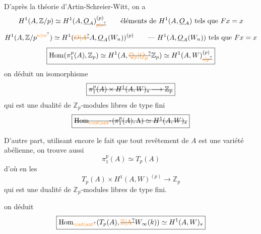 D'après la théorie d'Artin-Schreier-Witt, on a
\[
H^1(A,\mathbb Z/p)\simeq H^1(A,\underline O_A)_{\deleted{\unsure{p|s}}}^{(p)}
\qquad \text{éléments de } H^1(A,\underline O_A)\text{ tels que } Fx=x
\]
\[
H^1(A,\mathbb Z/p^{\unsure{n|m}})\simeq
H^1(\deleted{\unsure{O|A}}A,\underline O_A(W_n))^{(p)}
\qquad \text{--- }H^1(A,\underline O_A(W_n))\text{ tels que }Fx=x
\]
\[
\boxed{\operatorname{Hom}(\pi_1^p(A),\mathbb Z_p)\simeq H^1(A,\deleted{\unsure{\mathbb Q_p|\underline O_p}}\mathbb Z_p)
\simeq H^1(A,W)_{\deleted{\unsure{s|p}}}^{(p)}}
\]
   on déduit un  isomorphisme
\[
\boxed{\deleted{\pi_1^p(A)\times H^1(A,W)_s\longrightarrow\mathbb Z_p}}
\]
qui est une dualité  de $\mathbb Z_p$-modules libres de type fini
\[
\boxed{\deleted{\operatorname{Hom}_{\unsure{\mathrm{cont}|\mathrm{ant}}}(\pi_1^p(A),\Lambda)\simeq H^1(A,W)_s}}
\]

D'autre part, utilisant encore le fait que tout revêtement de $A$ est une variété abélienne, on trouve aussi
\[
\boxed{\pi_1^p(A)\simeq T_p(A)}
\]
d'où en les 
\[
\boxed{T_p(A)\times H^1(A,W)^{(p)}\longrightarrow\mathbb Z_p}
\]
qui est une dualité de $\mathbb Z_p$-modules libres de type fini.

  on déduit
\[
\boxed{\operatorname{Hom}_{\unsure{\mathrm{cont}|\mathrm{ant}}}(T_p(A),\deleted{\unsure{\mathbb Z|\Lambda}}W_{\infty}(k))\simeq H^1(A,W)_s}
\]
